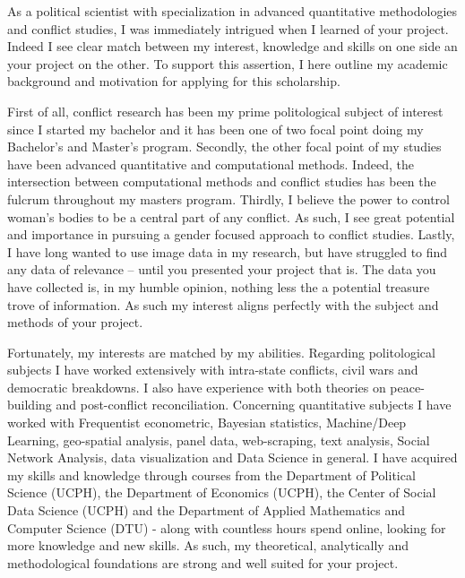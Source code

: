 \documentclass[a4paper]{article}
\begin{document}

As a political scientist with specialization in advanced quantitative methodologies and conflict studies, I was immediately intrigued when I learned of your project. Indeed I see clear match between my interest, knowledge and skills on one side an your project on the other. To support this assertion, I here outline my academic background and motivation for applying for this scholarship.\par

First of all, conflict research has been my prime politological subject of interest since I started my bachelor and it has been one of two focal point doing my Bachelor's and Master's program. Secondly, the other focal point of my studies have been advanced quantitative and computational methods. Indeed, the intersection between computational methods and conflict studies has been the fulcrum throughout my masters program. Thirdly, I believe the power to control woman's bodies to be a central part of any conflict. As such, I see great potential and importance in pursuing a gender focused approach to conflict studies. Lastly, I have long wanted to use image data in my research, but have struggled to find any data of relevance -- until you presented your project that is. The data you have collected is, in my humble opinion, nothing less the a potential treasure trove of information. As such my interest aligns perfectly with the subject and methods of your project.\par

Fortunately, my interests are matched by my abilities. Regarding politological subjects I have worked extensively with intra-state conflicts, civil wars and democratic breakdowns. I also have experience with both theories on peace-building and post-conflict reconciliation. Concerning quantitative subjects I have worked with Frequentist econometric, Bayesian statistics, Machine/Deep Learning, geo-spatial analysis, panel data, web-scraping, text analysis, Social Network Analysis, data visualization and Data Science in general. I have acquired my skills and knowledge through courses from the Department of Political Science (UCPH), the Department of Economics (UCPH), the Center of Social Data Science (UCPH) and the Department of Applied Mathematics and Computer Science (DTU) - along with countless hours spend online, looking for more knowledge and new skills. As such, my theoretical, analytically and methodological foundations are strong and well suited for your project.\par %
\end{document}
